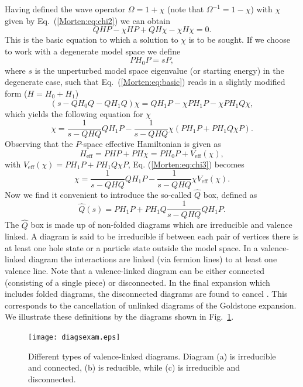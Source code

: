 Having defined the wave operator $\Omega = 1 +\chi$ (note that $
\Omega^{-1}=1-\chi$) with
$\chi$ given by Eq.~(\ref{Morten:eq:chi2}) we can obtain
\begin{equation}
     QHP-\chi HP +QH\chi - \chi H\chi = 0. \label{Morten:eq:basic}
\end{equation}
This is the basic equation to which a solution to $\chi$ is
to be sought.
If we choose to  work with a degenerate model space we define
\[
   PH_0 P = s P,
\]
where $s$ is the unperturbed model space eigenvalue
(or starting energy) in the degenerate case,
such that Eq.~(\ref{Morten:eq:basic}) reads in a slightly modified form
($H=H_0 + H_1$)
\[
    (s -QH_0 Q -QH_1 Q)\chi = QH_1 P -\chi PH_1 P -\chi PH_1 Q\chi,
\]
which yields the following equation for $\chi$
\begin{equation}
    \chi = \frac{1}{s - QHQ}QH_1 P -\frac{1}{s -QHQ}\chi\left(PH_1 P +
    PH_1 Q\chi P\right).\label{Morten:eq:chi3}
\end{equation}
Observing that  the $P$-space effective Hamiltonian is given as
\[
     H_{\mathrm{eff}}= PHP+PH\chi=PH_0 P + V_{\mathrm{eff}}(\chi),
\]
with $V_{\mathrm{eff}}(\chi)= PH_1 P + PH_1Q\chi P$, Eq. (\ref{Morten:eq:chi3}) becomes
\begin{equation}
     \chi = \frac{1}{s - QHQ}QH_1 P -\frac{1}{s -QHQ}
     \chi V_{\mathrm{eff}}(\chi ).
     \label{Morten:eq:chi4}
\end{equation}
Now we find it convenient to introduce the so-called $\hat{Q}$ box,
defined as
\begin{equation}
     \hat{Q}(s)=PH_1 P + PH_1 Q\frac{1}{s - QHQ}
      QH_1 P.\label{Morten:eq:qbox}
\end{equation}
The $\hat{Q}$ box is made up of non-folded diagrams which are irreducible
and valence linked. A diagram is said to be irreducible if between each pair
of vertices there is at least one hole state or a particle state outside
the model space. In a valence-linked diagram the interactions are linked
(via fermion lines) to at least one valence line. Note that a valence-linked
diagram can be either connected (consisting of a single piece) or
disconnected. In the final expansion which includes folded diagrams, the
disconnected diagrams are found to cancel \cite{Morten:ko90}. 
This corresponds to the cancellation of unlinked diagrams
of the Goldstone expansion.
We illustrate
these definitions by the diagrams shown in Fig.~\ref{Morten:fig:diagsexam}.
\begin{figure}%
	\begin{center}
      	\texttt{[image: diagsexam.eps]}
	\end{center}
\caption{Different types of valence-linked diagrams. Diagram (a)
is irreducible and connected, (b) is reducible, while (c) is irreducible
and disconnected.}
\label{Morten:fig:diagsexam}
\end{figure}
